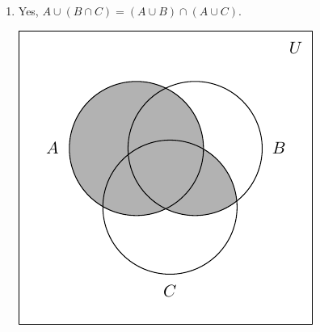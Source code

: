 \documentclass[11pt]{article}
\theoremstyle{definition}  %
\newcounter{HW}
\begin{document}
\begin{enumerate}
\setcounter{enumi}{\value{HW}}

\item  Yes, $A \cup (B \cap C) = (A \cup B) \cap (A \cup C)$.

\begin{center}

\includegraphics{SetTheory-46}


\end{center}

\setcounter{HW}{\value{enumi}}
\end{enumerate}
\end{document}
